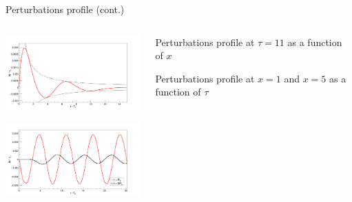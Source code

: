 \documentclass[10pt,t,handout]{beamer}
\begin{document}
\begin{frame}{Perturbations profile (cont.)}

\begin{columns}[T]
\begin{column}{0.7\textwidth}
    \centering\includegraphics[width=6.5cm]{Images/P_t11.png}

    \centering\includegraphics[width=6.5cm]{Images/P_r.png}
\end{column}
\begin{column}{0.35\textwidth}
\vspace{1cm}
\small Perturbations profile at $\tau = 11$ as a function of $x$

\vspace{2.7cm}
\small Perturbations profile at $x = 1$ and $x =5$ as a function of $\tau$

\end{column}
\end{columns}


\end{frame}
\end{document}
